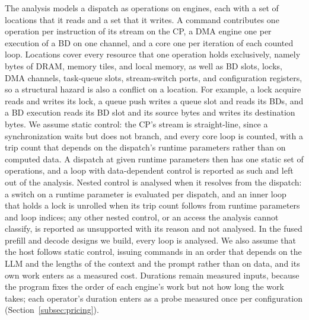 The analysis models a dispatch as operations on engines, each with a set of locations that it reads and a set that it writes.
A command contributes one operation per instruction of its stream on the CP, a DMA engine one per execution of a BD on one channel, and a core one per iteration of each counted loop.
Locations cover every resource that one operation holds exclusively, namely bytes of DRAM, memory tiles, and local memory, as well as BD slots, locks, DMA channels, task-queue slots, stream-switch ports, and configuration registers, so a structural hazard is also a conflict on a location.
For example, a lock acquire reads and writes its lock, a queue push writes a queue slot and reads its BDs, and a BD execution reads its BD slot and its source bytes and writes its destination bytes.
We assume static control: the CP's stream is straight-line, since a synchronization waits but does not branch, and every core loop is counted, with a trip count that depends on the dispatch's runtime parameters rather than on computed data.
A dispatch at given runtime parameters then has one static set of operations, and a loop with data-dependent control is reported as such and left out of the analysis.
Nested control is analysed when it resolves from the dispatch: a switch on a runtime parameter is evaluated per dispatch, and an inner loop that holds a lock is unrolled when its trip count follows from runtime parameters and loop indices; any other nested control, or an access the analysis cannot classify, is reported as unsupported with its reason and not analysed. In the fused prefill and decode designs we build, every loop is analysed.
We also assume that the host follows static control, issuing commands in an order that depends on the LLM and the lengths of the context and the prompt rather than on data, and its own work enters as a measured cost.
Durations remain measured inputs, because the program fixes the order of each engine's work but not how long the work takes; each operator's duration enters as a probe measured once per configuration (Section~\ref{subsec:pricing}).
